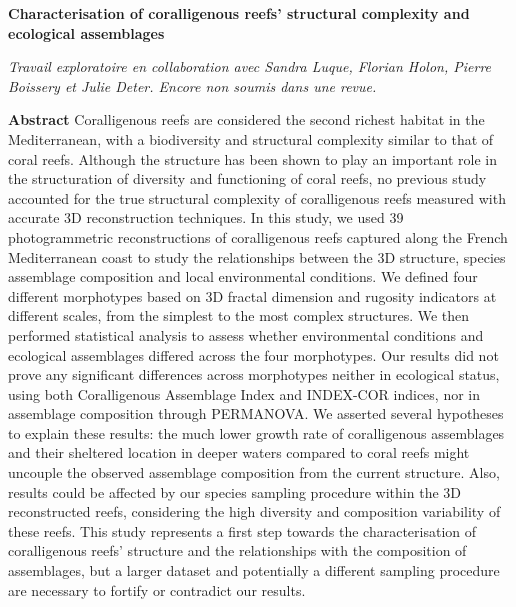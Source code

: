 \clearpage

\fontsize{14}{14}\noindent\textbf{Characterisation of coralligenous reefs’ structural complexity and \\ecological assemblages}

\normalsize
\medskip

\noindent\textit{Travail exploratoire en collaboration avec Sandra Luque, Florian Holon, Pierre Boissery et Julie Deter. Encore non soumis dans une revue.}

\medskip

\noindent\textbf{Abstract}
Coralligenous reefs are considered the second richest habitat in the Mediterranean, with a biodiversity and structural complexity similar to that of coral reefs. Although the structure has been shown to play an important role in the structuration of diversity and functioning of coral reefs, no previous study accounted for the true structural complexity of coralligenous reefs measured with accurate 3D reconstruction techniques. In this study, we used 39 photogrammetric reconstructions of coralligenous reefs captured along the French Mediterranean coast to study the relationships between the 3D structure, species assemblage composition and local environmental conditions. We defined four different morphotypes based on 3D fractal dimension and rugosity indicators at different scales, from the simplest to the most complex structures. We then performed statistical analysis to assess whether environmental conditions and ecological assemblages differed across the four morphotypes. Our results did not prove any significant differences across morphotypes neither in ecological status, using both Coralligenous Assemblage Index and INDEX-COR indices, nor in assemblage composition through PERMANOVA. We asserted several hypotheses to explain these results: the much lower growth rate of coralligenous assemblages and their sheltered location in deeper waters compared to coral reefs might uncouple the observed assemblage composition from the current structure. Also, results could be affected by our species sampling procedure within the 3D reconstructed reefs, considering the high diversity and composition variability of these reefs. This study represents a first step towards the characterisation of coralligenous reefs’ structure and the relationships with the composition of assemblages, but a larger dataset and potentially a different sampling procedure are necessary to fortify or contradict our results.

\medskip


